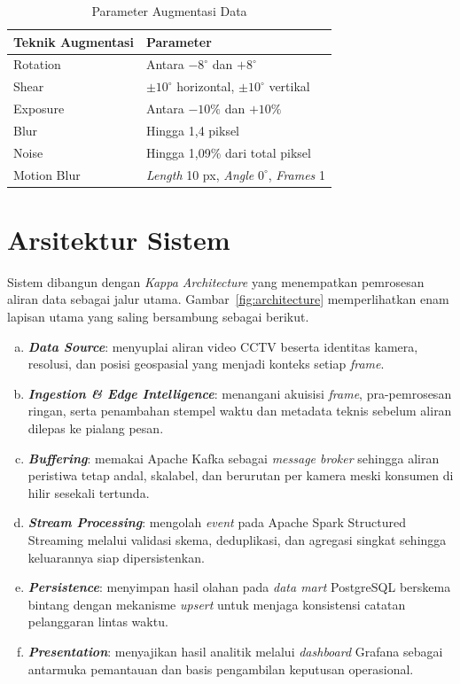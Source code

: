 \begin{table}[htpb]
  \centering
  \caption{Parameter Augmentasi Data}
  \label{tab:augmentasi}
  \begin{tabular}{ll}
    \toprule
    \textbf{Teknik Augmentasi} & \textbf{Parameter} \\
    \midrule
    Rotation & Antara $-8^\circ$ dan $+8^\circ$ \\
    Shear & $\pm 10^\circ$ horizontal, $\pm 10^\circ$ vertikal \\
    Exposure & Antara $-10\%$ dan $+10\%$ \\
    Blur & Hingga 1,4 piksel \\
    Noise & Hingga 1,09\% dari total piksel \\
    Motion Blur & \textit{Length} 10 px, \textit{Angle} $0^\circ$, \textit{Frames} 1 \\
  \bottomrule
  \end{tabular}
\end{table}

\section{Arsitektur Sistem}
Sistem dibangun dengan \textit{Kappa Architecture} \cite{kreps2014questioning} yang menempatkan pemrosesan aliran data sebagai jalur utama. Gambar~\ref{fig:architecture} memperlihatkan enam lapisan utama yang saling bersambung sebagai berikut.

\begin{enumerate}[a.]
  \item \textbf{\textit{Data Source}}: menyuplai aliran video CCTV beserta identitas kamera, resolusi, dan posisi geospasial yang menjadi konteks setiap \textit{frame}.

  \item \textbf{\textit{Ingestion \& Edge Intelligence}}: menangani akuisisi \textit{frame}, pra-pemrosesan ringan, serta penambahan stempel waktu dan metadata teknis sebelum aliran dilepas ke pialang pesan.

  \item \textbf{\textit{Buffering}}: memakai Apache Kafka sebagai \textit{message broker} sehingga aliran peristiwa tetap andal, skalabel, dan berurutan per kamera meski konsumen di hilir sesekali tertunda.

  \item \textbf{\textit{Stream Processing}}: mengolah \textit{event} pada Apache Spark Structured Streaming melalui validasi skema, deduplikasi, dan agregasi singkat sehingga keluarannya siap dipersistenkan.

  \item \textbf{\textit{Persistence}}: menyimpan hasil olahan pada \textit{data mart} PostgreSQL berskema bintang dengan mekanisme \textit{upsert} untuk menjaga konsistensi catatan pelanggaran lintas waktu.

  \item \textbf{\textit{Presentation}}: menyajikan hasil analitik melalui \textit{dashboard} Grafana sebagai antarmuka pemantauan dan basis pengambilan keputusan operasional.
\end{enumerate}

